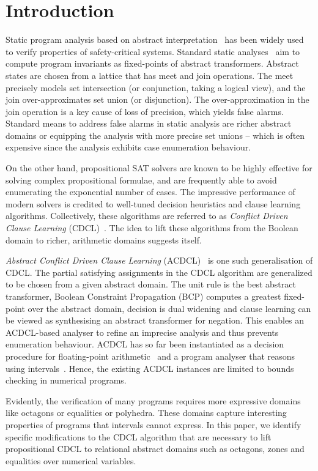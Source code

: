 \section{Introduction}

%
Static program analysis based on abstract interpretation~\cite{CC77, 
DBLP:conf/pldi/BlanchetCCFMMMR03} has been widely used to 
verify properties of safety-critical systems.
Standard static analyses~\cite{se2011} aim to compute program invariants as
fixed-points of abstract transformers.  Abstract states are chosen from a
lattice that has meet and join operations.  The meet precisely models set
intersection (or conjunction, taking a logical view), and the join
over-approximates set union (or disjunction).  The over-approximation in the
join operation is a key cause of loss of precision, which yields false
alarms.  Standard means to address false alarms in static analysis are 
richer abstract domains or equipping the analysis with more precise set
unions -- which is often expensive since the analysis exhibits case
enumeration behaviour.

%
On the other hand, propositional SAT solvers are known to be highly
effective for solving complex propositional formulae, and are frequently
able to avoid enumerating the exponential number of cases.  The impressive
performance of modern solvers is credited to well-tuned decision heuristics
and clause learning algorithms.  Collectively, these
algorithms are referred to as \emph{Conflict Driven Clause Learning}
(CDCL)~\cite{cdcl}. The idea to lift these algorithms from the Boolean
domain to richer, arithmetic domains suggests itself.

\emph{Abstract Conflict Driven Clause Learning} (ACDCL)~\cite{dhk2013-popl}
is one such generalisation of CDCL.  The partial satisfying assignments in
the CDCL algorithm are generalized to be chosen from a given abstract domain. 
The unit rule is the best abstract transformer, Boolean Constraint
Propagation (BCP) computes a greatest fixed-point over the abstract domain,
decision is dual widening and clause learning can be viewed as synthesising
an abstract transformer for negation.  This enables an ACDCL-based analyser
to refine an imprecise analysis and thus prevents enumeration behaviour. 
ACDCL has so far been instantiated as a decision procedure for
floating-point arithmetic~\cite{DBLP:journals/fmsd/BrainDGHK14} and a
program analyser that reasons using intervals~\cite{tacas12}.  Hence, the
existing ACDCL instances are limited to bounds checking in numerical
programs.

Evidently, the verification of many programs requires more expressive
domains like octagons or equalities or polyhedra.  These domains capture
interesting properties of programs that intervals cannot express.  In this
paper, we identify specific modifications to the CDCL algorithm that are
necessary to lift propositional CDCL to relational abstract domains such as
octagons, zones and equalities over numerical variables.
